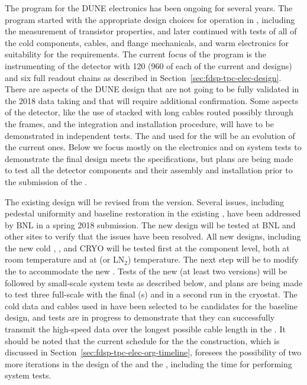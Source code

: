 The  program for the DUNE  electronics has been ongoing for several years.  The  program started with the appropriate design choices for operation
in \lar, including the measurement of transistor properties, and later
continued with tests of all of the cold components, cables, \fdth and flange mechanicals, and warm electronics for suitability for the  requirements.  The current focus of the  program is the instrumenting of the  detector with \num{120}  (\num{960} of each of the current  and   designs) and six full  readout chains as described in Section~\ref{sec:fdsp-tpc-elec-design}. There are aspects of the DUNE design that are not going to be fully validated in the 2018  data taking and that will require additional confirmation. Some aspects of the detector, like the use of stacked  with long cables routed possibly through the  frames, and the integration and installation procedure, will have to be demonstrated in independent tests. The  and  used for the  will be an evolution of the current  ones. Below we focus mostly on the electronics and on system tests to demonstrate the final design meets the  specifications, but plans are being made to test all the detector components and their assembly and installation prior to the submission of the .

The existing  design will be revised from the  version. Several issues, 
including pedestal uniformity and baseline restoration in the existing , have been 
addressed by BNL in a spring 2018 submission. The new design will be tested at BNL and other sites to 
verify that the issues have been resolved. All new  designs, including the new cold , , and CRYO will be tested first at the component level, both at room temperature and at \lar (or LN$_2$) temperature. The next step will be to modify the  to accommodate the new .  Tests of the new  (at least two versions) will be followed by small-scale system tests as described below, and plans are being made to test three full-scale  with the final (s) and  in a second run in the  cryostat.  The cold data and  cables used in  have been selected to be candidates for the  baseline design, and tests are in progress to demonstrate that they can successfully transmit the high-speed data over the longest possible cable length in the . It should be noted that the current schedule for the the  construction, which is discussed in Section~\ref{sec:fdsp-tpc-elec-org-timeline}, foresees the possibility of two more iterations in the design of the  and the , including the time for performing system tests.

